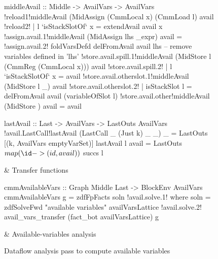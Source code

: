 \documentclass[blockstyle,preprint,natbib,nocopyrightspace]{sigplanconf}
\newcommand\figlabel[1]{\label{fig:#1}}
\begin{document}
\begin{figure*}
\begin{codetable}
\begin{code}
middleAvail :: Middle -> AvailVars -> AvailVars
!reload1!middleAvail (MidAssign (CmmLocal x) (CmmLoad l) avail
!reload2!                 | l `isStackSlotOf` x = extendAvail avail x
!assign.avail.1!middleAvail (MidAssign lhs _expr) avail = 
!assign.avail.2!  foldVarsDefd delFromAvail avail lhs  -- remove variables defined in 'lhs'
!store.avail.spill.1!middleAvail (MidStore l (CmmReg (CmmLocal x))) avail
!store.avail.spill.2!                 | l `isStackSlotOf` x = avail
!store.avail.otherslot.1!middleAvail (MidStore l _) avail 
!store.avail.otherslot.2!                 | isStackSlot l = delFromAvail avail (variableOfSlot l)
!store.avail.other!middleAvail (MidStore {}) avail = avail

lastAvail :: Last -> AvailVars -> LastOuts AvailVars
!avail.LastCall!lastAvail (LastCall _ (Just k) _ _) _ = LastOuts [(k, AvailVars emptyVarSet)]
lastAvail l avail = LastOuts $ map (\id -> (id, avail)) $ succs l
\end{code}%
\B
& Transfer \mbox{functions}\\
\hline

\T\begin{code}
cmmAvailableVars :: Graph Middle Last -> BlockEnv AvailVars
cmmAvailableVars g = zdfFpFacts soln
!avail.solve.1!  where soln = zdfSolveFwd "available variables" availVarsLattice 
!avail.solve.2!               avail_vars_transfer (fact_bot availVarsLattice) g
\end{code}%
\B
& Available-variables analysis\\

\end{codetable}
\caption{Dataflow analysis pass to compute available variables}
\figlabel{avail-all}
\figlabel{avail}
\figlabel{avail-lattice}
\figlabel{avail-gen-kill}
\figlabel{avail-transfers}
\figlabel{avail-running}
\end{figure*}
\end{document}
